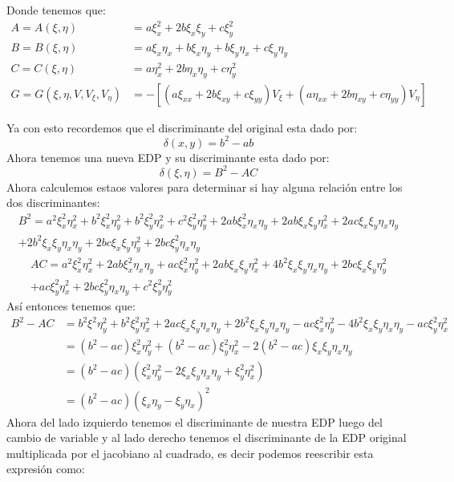 \begin{homeworkProblem}
\begin{solucion}
        Donde tenemos que:
        \begin{align*}
           A=A(\xi,\eta)&=a\xi_x^2+2b\xi_x\xi_y+c\xi_y^2\\
           B=B(\xi,\eta)&=a\xi_x\eta_x+b\xi_x\eta_y+b\xi_y\eta_x+c\xi_y\eta_y\\
           C=C(\xi,\eta)&=a\eta_x^2+2b\eta_x\eta_y+c\eta_y^2\\
           G=G(\xi,\eta,V,V_\xi,V_\eta)&=-\left[(a\xi_{xx}+2b\xi_{xy}+c\xi_{yy})V_\xi+(a\eta_{xx}+2b\eta_{xy}+c\eta_{yy})V_\eta\right]
        \end{align*}

        Ya con esto recordemos que el discriminante del original esta dado por:
        $$\delta(x,y)=b^2-ab$$
        Ahora tenemos una nueva EDP y su discriminante esta dado por:
        $$\delta(\xi,\eta)=B^2-AC$$
        Ahora calculemos estaos valores para determinar si hay alguna relación entre los dos discriminantes:
        \begin{multline*}
            B^2=a^2\xi_x^2\eta_x^2+b^2\xi_x^2\eta_y^2+b^2\xi_y^2\eta_x^2+c^2\xi_y^2\eta_y^2+2ab\xi_x^2\eta_x\eta_y+2ab\xi_x\xi_y\eta_x^2+2ac\xi_x\xi_y\eta_x\eta_y\\
            +2b^2\xi_x\xi_y\eta_x\eta_y+2bc\xi_x\xi_y\eta_y^2+2bc\xi_y^2\eta_x\eta_y
            \end{multline*}
            \begin{multline*}
                AC=a^2\xi_x^2\eta_x^2+2ab\xi_x^2\eta_x\eta_y+ac\xi_x^2\eta_y^2+2ab\xi_x\xi_y\eta_x^2+4b^2\xi_x\xi_y\eta_x\eta_y+2bc\xi_x\xi_y\eta_y^2\\
                +ac\xi_y^2\eta_x^2+2bc\xi_y^2\eta_x\eta_y+c^2\xi_y^2\eta_y^2
            \end{multline*}
            Así entonces tenemos que:
            \begin{align*}
                B^2-AC&=b^2\xi^2\eta_y^2+b^2\xi_y^2\eta_x^2+2ac\xi_x\xi_y\eta_x\eta_y+2b^2\xi_x\xi_y\eta_x\eta_y-ac\xi_x^2\eta_y^2-4b^2\xi_x\xi_y\eta_x\eta_y-ac\xi_y^2\eta_x^2\\
                &=(b^2-ac)\xi_x^2\eta_y^2+(b^2-ac)\xi_y^2\eta_x^2-2(b^2-ac)\xi_x\xi_y\eta_x\eta_y\\
                &=(b^2-ac)(\xi_x^2\eta_y^2-2\xi_x\xi_y\eta_x\eta_y+\xi_y^2\eta_x^2)\\
                &=(b^2-ac)(\xi_x\eta_y-\xi_y\eta_x)^2
            \end{align*}
            Ahora del lado izquierdo tenemos el discriminante de nuestra EDP luego del cambio de variable y al lado derecho tenemos el discriminante de la EDP original multiplicada por el jacobiano al cuadrado, es decir podemos reescribir esta expresión como: 

\end{solucion}
\end{homeworkProblem}
